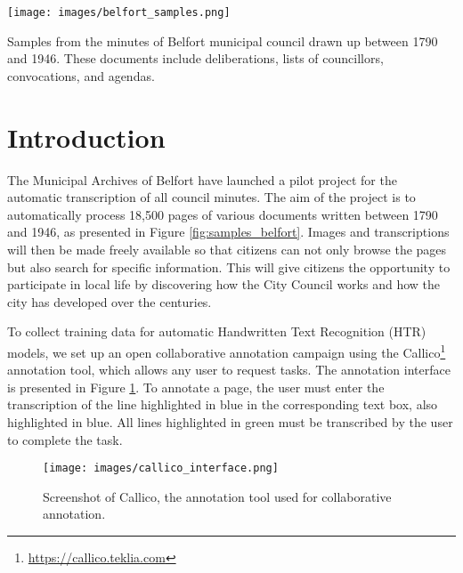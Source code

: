 \documentclass[sigconf]{acmart}
\begin{document}


\begin{teaserfigure}
  \texttt{[image: images/belfort\_samples.png]}
    \caption{Samples from the minutes of Belfort municipal council drawn up between 1790 and 1946. These documents include deliberations, lists of councillors, convocations, and agendas.}
    \label{fig:samples_belfort}
\end{teaserfigure}



\maketitle

\section{Introduction}
The Municipal Archives of Belfort have launched a pilot project for the automatic transcription of all council minutes. The aim of the project is to automatically process 18,500 pages of various documents written between 1790 and 1946, as presented in Figure \ref{fig:samples_belfort}.
Images and transcriptions will then be made freely available so that citizens can not only browse the pages but also search for specific information. This will give citizens the opportunity to participate in local life by discovering how the City Council works and how the city has developed over the centuries.



To collect training data for automatic Handwritten Text Recognition (HTR) models, we set up an open collaborative annotation campaign using the Callico\footnote{\url{https://callico.teklia.com}} annotation tool, which allows any user to request tasks. The annotation interface is presented in Figure \ref{fig:callico}. To annotate a page, the user must enter the transcription of the line highlighted in blue in the corresponding text box, also highlighted in blue. All lines highlighted in green must be transcribed by the user to complete the task. 

\begin{figure}[ht]
    \centering
    \texttt{[image: images/callico\_interface.png]}
    \caption{Screenshot of Callico, the annotation tool used for collaborative annotation.}
    \label{fig:callico}
\end{figure}
\end{document}
